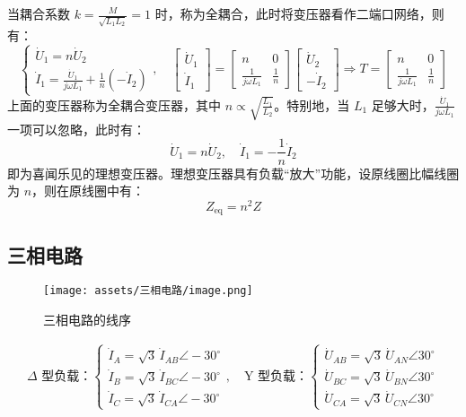 \documentclass[a4paper]{article}  %
\theoremstyle{MyLineTheoremStyle} %
\theoremstyle{MyBlockTheoremStyle} %
\theoremstyle{MySubsubsectionStyle} %
\begin{document}
\begin{multicols*}{4}
当耦合系数 $k = \frac{M}{\sqrt{L_1 L_2}} = 1$ 时，称为全耦合，此时将变压器看作二端口网络，则有：
\begin{equation*}
\begin{cases}
\dot{U}_1 = n \dot{U}_2 \\ 
\dot{I}_1 = \frac{\dot{U}_1}{j \omega L_1} + \frac{1}{n} (- \dot{I}_2)
\end{cases}
,\quad 
\begin{bmatrix}
    \dot{U}_1 \\ \dot{I}_1 
\end{bmatrix}
= 
\begin{bmatrix}
    n & 0 \\ 
    \frac{1}{j \omega L_1} & \frac{1}{n} 
\end{bmatrix}
\begin{bmatrix}
    \dot{U}_2 \\ 
    - \dot{I}_2
\end{bmatrix}
\Longrightarrow 
T = 
\begin{bmatrix}
    n & 0 \\ 
    \frac{1}{j \omega L_1} & \frac{1}{n} 
\end{bmatrix}
\end{equation*}
上面的变压器称为全耦合变压器，其中 $n \propto \sqrt{\frac{L_1}{L_2}}$。特别地，当 $L_1$ 足够大时，$\frac{\dot{U}_1}{j\omega L_1}$ 一项可以忽略，此时有：
\begin{equation}
    \dot{U}_1 = n \dot{U}_2,\quad \dot{I}_1 =  - \frac{1}{n} \dot{I}_2
\end{equation}
即为喜闻乐见的理想变压器。理想变压器具有负载“放大”功能，设原线圈比幅线圈为 $n$，则在原线圈中有：
\begin{equation}
Z_{\text{eq}} = n^{2} Z
\end{equation}

\subsection{三相电路}

\begin{figure}[H]\centering
    \texttt{[image: assets/三相电路/image.png]}
    \caption{三相电路的线序}
\end{figure}


\begin{gather*}
    \text{$\Delta$ 型负载：}
    \begin{cases}
        \dot{I}_A = \sqrt{3} \, \dot{I}_{AB} \angle -30^\circ \\
        \dot{I}_B = \sqrt{3} \, \dot{I}_{BC} \angle -30^\circ \\
        \dot{I}_C = \sqrt{3} \, \dot{I}_{CA} \angle -30^\circ
    \end{cases}
    ,\quad 
    \text{Y 型负载：}
    \begin{cases}
        \dot{U}_{AB} = \sqrt{3} \, \dot{U}_{AN} \angle 30^\circ \\
        \dot{U}_{BC} = \sqrt{3} \, \dot{U}_{BN} \angle 30^\circ \\
        \dot{U}_{CA} = \sqrt{3} \, \dot{U}_{CN} \angle 30^\circ
    \end{cases}
\end{gather*}


\end{multicols*}
\end{document}
